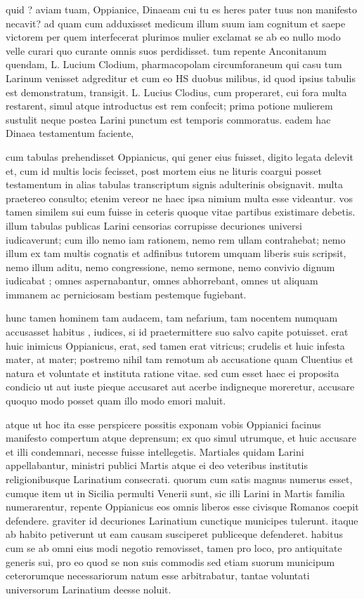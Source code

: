  quid ? aviam tuam, Oppianice, Dinaeam cui tu es heres pater tuus non manifesto necavit? ad quam cum adduxisset medicum illum suum iam cognitum et saepe victorem per quem interfecerat plurimos mulier exclamat se ab eo nullo modo velle curari quo curante omnis suos perdidisset. tum repente Anconitanum quendam, L. Lucium Clodium, pharmacopolam circumforaneum qui casu tum Larinum venisset adgreditur et cum eo HS duobus milibus, id quod ipsius tabulis est demonstratum, transigit. L. Lucius Clodius, cum properaret, cui fora multa restarent, simul atque introductus est rem confecit; prima potione mulierem sustulit neque postea Larini punctum est temporis commoratus. eadem hac Dinaea testamentum faciente,

 cum tabulas prehendisset Oppianicus, qui gener eius fuisset, digito legata delevit et, cum id multis locis fecisset, post mortem eius ne lituris coargui posset testamentum in alias tabulas transcriptum signis adulterinis obsignavit. multa praetereo consulto; etenim vereor ne haec ipsa nimium multa esse videantur. vos tamen similem sui eum fuisse in ceteris quoque vitae partibus existimare debetis. illum tabulas publicas Larini censorias corrupisse decuriones universi iudicaverunt; cum illo nemo iam rationem, nemo rem ullam contrahebat; nemo illum ex tam multis cognatis et adfinibus tutorem umquam liberis suis scripsit, nemo illum aditu, nemo congressione, nemo sermone, nemo convivio dignum iudicabat ; omnes aspernabantur, omnes abhorrebant, omnes ut aliquam immanem ac perniciosam bestiam pestemque fugiebant.

 hunc tamen hominem tam audacem, tam nefarium, tam nocentem numquam accusasset habitus , iudices, si id praetermittere suo salvo capite potuisset. erat huic inimicus Oppianicus, erat, sed tamen erat vitricus; crudelis et huic infesta mater, at mater; postremo nihil tam remotum ab accusatione quam Cluentius et natura et voluntate et instituta ratione vitae. sed cum esset haec ei proposita condicio ut aut iuste pieque accusaret aut acerbe indigneque moreretur, accusare quoquo modo posset quam illo modo emori maluit.

 atque ut hoc ita esse perspicere possitis exponam vobis Oppianici facinus manifesto compertum atque deprensum; ex quo simul utrumque, et huic accusare et illi condemnari, necesse fuisse intellegetis. Martiales quidam Larini appellabantur, ministri publici Martis atque ei deo veteribus institutis religionibusque Larinatium consecrati. quorum cum satis magnus numerus esset, cumque item ut in Sicilia permulti Venerii sunt, sic illi Larini in Martis familia numerarentur, repente Oppianicus eos omnis liberos esse civisque Romanos coepit defendere. graviter id decuriones Larinatium cunctique municipes tulerunt. itaque ab habito petiverunt ut eam causam susciperet publiceque defenderet. habitus cum se ab omni eius modi negotio removisset, tamen pro loco, pro antiquitate generis sui, pro eo quod se non suis commodis sed etiam suorum municipum ceterorumque necessariorum natum esse arbitrabatur, tantae voluntati universorum Larinatium deesse noluit.

